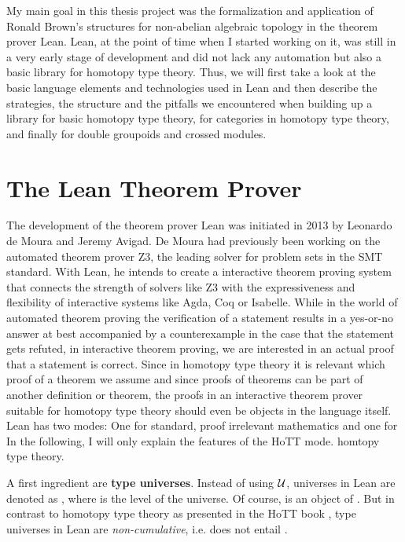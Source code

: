 My main goal in this thesis project was the formalization and application of
Ronald Brown's structures for non-abelian algebraic topology in the theorem prover
Lean.
Lean, at the point of time when I started working on it, was still in a very early
stage of development and did not lack any automation but also a basic library
for homotopy type theory.
Thus, we will first take a look at the basic language elements and technologies
used in Lean and then describe the strategies, the structure and the pitfalls
we encountered when building up a library for basic homotopy type theory,
for categories in homotopy type theory, and finally for double groupoids and
crossed modules.

\section{The Lean Theorem Prover}

The development of the theorem prover Lean was initiated in 2013 by Leo\-nar\-do
de Moura and Jeremy Avigad.
De Moura had previously been working on the automated theorem prover Z3, the leading
solver for problem sets in the SMT standard.
With Lean, he intends to create a interactive theorem proving system that connects
the strength of solvers like Z3 with the expressiveness and flexibility of
interactive systems like Agda, Coq or Isabelle.
While in the world of automated theorem proving the verification of a statement
results in a yes-or-no answer at best accompanied by a counterexample in the case
that the statement gets refuted, in interactive theorem proving, we are interested
in an actual proof that a statement is correct.
Since in homotopy type theory it is relevant which proof of a theorem we assume
and since proofs of theorems can be part of another definition or theorem,
the proofs in an interactive theorem prover suitable for homotopy type theory
should even be objects in the language itself.
Lean has two modes: One for standard, proof irrelevant mathematics and one for
In the following, I will only explain the features of the HoTT mode.
homtopy type theory.

A first ingredient are \textbf{type universes}.
Instead of using $\mathcal{U}$, universes in Lean are denoted as , where
 is the level of the universe.
Of course,  is an object of .
But in contrast to homotopy type theory as presented in the HoTT book \cite{hottbook},
type universes in Lean are \emph{non-cumulative}, 
i.e.  does not entail .

